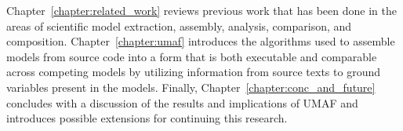 Chapter~\ref{chapter:related_work} reviews previous work that has been done in the areas of scientific model extraction, assembly, analysis, comparison, and composition.
Chapter~\ref{chapter:umaf} introduces the algorithms used to assemble models from source code into a form that is both executable and comparable across competing models by utilizing information from source texts to ground variables present in the models.
Finally, Chapter~\ref{chapter:conc_and_future} concludes with a discussion of the results and implications of UMAF and introduces possible extensions for continuing this research.
